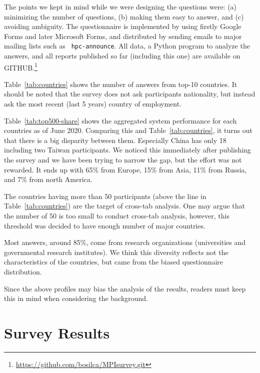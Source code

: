 \documentclass[sigconf,nonacm]{acmart}
\begin{document}
The points we kept in mind while we were designing the questions were: (a)
minimizing the number of questions, (b) making them easy to answer,
and (c) avoiding ambiguity. The 
questionnaire is implemented by using firstly Google Forms and later Microsoft
Forms, and distributed by sending emails to major mailing lists such as {\tt
hpc-announce}. All data, a Python program to analyze the answers, and all
reports published so far (including this one) are available on
GITHUB.\footnote{\url{https://github.com/bosilca/MPIsurvey.git}}

Table~\ref{tab:countries} shows the number of answers from top-10 countries. It
should be noted that the survey does not ask participants nationality, but
instead ask the most recent (last 5 years) country of employment.

Table~\ref{tab:top500-share} shows the aggregated system performance for
each countries as of June 2020. Comparing this and
Table~\ref{tab:countries}, it turns out that there is a big disparity
between them. Especially China has only 18 including two Taiwan
participants. We noticed this immediately after publishing the survey
and we have been trying to narrow the gap, but the effort was not
rewarded. It ends up with 65\% from Europe, 15\% from Asia, 11\%
from Russia, and 7\% from north America.

The countries having more than 50 participants (above the line in
Table~\ref{tab:countries}) are the target of cross-tab analysis. One
may argue that the number of 50 is too small to conduct cross-tab
analysis, however, this threshold was decided to have enough number of 
major countries.

Most answers, around 85\%, come from research organizations
(universities and governmental research institutes).  We think this
diversity reflects not the characteristics of the countries, but
came from the biased questionnaire distribution.

Since the above profiles may bias the analysis of the results,
readers must keep this in mind when considering the background. 

\section{Survey Results}
\end{document}
